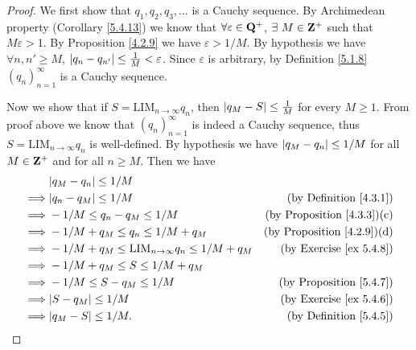 \begin{proof}
    We first show that \(q_1, q_2, q_3, \dots\) is a Cauchy sequence.
    By Archimedean property (Corollary \ref{5.4.13}) we know that \(\forall \varepsilon \in \mathbf{Q}^+\), \(\exists\ M \in \mathbf{Z}^+\) such that \(M\varepsilon > 1\).
    By Proposition \ref{4.2.9} we have \(\varepsilon > 1 / M\).
    By hypothesis we have \(\forall n, n' \geq M\), \(\left\lvert q_n - q_{n'}\right\rvert \leq \frac{1}{M} < \varepsilon\).
    Since \(\varepsilon\) is arbitrary, by Definition \ref{5.1.8} \((q_n)_{n = 1}^{\infty}\) is a Cauchy sequence.

    Now we show that if \(S = \text{LIM}_{n \to \infty} q_n\), then \(\left\lvert q_M - S\right\rvert \leq \frac{1}{M}\) for every \(M \geq 1\).
    From proof above we know that \((q_n)_{n = 1}^\infty\) is indeed a Cauchy sequence, thus \(S = \text{LIM}_{n \to \infty} q_n\) is well-defined.
    By hypothesis we have \(\left\lvert q_M - q_n\right\rvert \leq 1 / M\) for all \(M \in \mathbf{Z}^+\) and for all \(n \geq M\).
    Then we have
    \begin{align*}
                 & \abs{q_M - q_n} \leq 1 / M                                                                                \\
        \implies & \abs{q_n - q_M} \leq 1 / M                                       & \text{(by Definition \ref{4.3.1})}     \\
        \implies & -1 / M \leq q_n - q_M \leq 1 / M                                 & \text{(by Proposition \ref{4.3.3})(c)} \\
        \implies & -1 / M + q_M \leq q_n \leq 1 / M + q_M                           & \text{(by Proposition \ref{4.2.9})(d)} \\
        \implies & -1 / M + q_M \leq \text{LIM}_{n \to \infty} q_n \leq 1 / M + q_M & \text{(by Exercise \ref{ex 5.4.8})}    \\
        \implies & -1 / M + q_M \leq S \leq 1 / M + q_M                                                                      \\
        \implies & -1 / M \leq S - q_M \leq 1 / M                                   & \text{(by Proposition \ref{5.4.7})}    \\
        \implies & \abs{S - q_M} \leq 1 / M                                         & \text{(by Exercise \ref{ex 5.4.6})}    \\
        \implies & \abs{q_M - S} \leq 1 / M.                                        & \text{(by Definition \ref{5.4.5})}
    \end{align*}
\end{proof}

